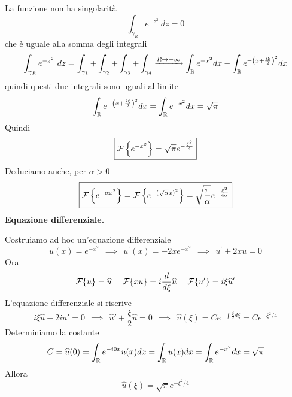 La funzione non ha singolarità
\begin{equation*}
\int_{\gamma_{R}} e^{- z^{2}} \ dz = 0
\end{equation*}
che è uguale alla somma degli integrali
\begin{equation*}
\int_{\gamma_{R}} e^{- z^{2}} \ dz = \int_{\gamma_{1}} + \int_{\gamma_{2}} + \int_{\gamma_{3}} + \int_{\gamma_{4}}\xrightarrow{R\rightarrow + \infty}\int_{\mathbb{R}} e^{- x^{2}} dx - \int_{\mathbb{R}} e^{- \left(x + \frac{i\xi}{2}\right)^{2}} dx
\end{equation*}
quindi questi due integrali sono uguali al limite
\begin{equation*}
\int_{\mathbb{R}} e^{- \left(x + \frac{i\xi}{2}\right)^{2}} dx = \int_{\mathbb{R}} e^{- x^{2}} dx = \sqrt{\pi}
\end{equation*}
Quindi
\begin{equation*}
\boxed{\mathcal{F} \left\{e^{- x^{2}}\right\} = \sqrt{\pi} e^{- \frac{\xi^{2}}{4}}}
\end{equation*}
Deduciamo anche, per $\alpha > 0$
\begin{equation*}
\boxed{\mathcal{F} \left\{e^{- \alpha x^{2}}\right\} = \mathcal{F} \left\{e^{- (\sqrt{\alpha} x)^{2}}\right\} = \sqrt{\frac{\pi}{\alpha}} e^{- \frac{\xi^{2}}{4\alpha}}}
\end{equation*}
\textbf{Equazione differenziale.}

Costruiamo ad hoc un'equazione differenziale
\begin{equation*}
u(x) = e^{- x^{2}} \ \ \implies \ \ u^{'} (x) = -2xe^{- x^{2}} \ \ \implies \ \ u^{'} + 2xu = 0
\end{equation*}
Ora
\begin{equation*}
\mathcal{F} \{u\} = \widehat{u} \ \ \ \ \mathcal{F} \{xu\} = i\frac{d}{d\xi}\widehat{u} \ \ \ \ \mathcal{F} \{u'\} = i\xi \widehat{u} '
\end{equation*}
L'equazione differenziale si riscrive
\begin{equation*}
i\xi \hat{u} + 2i\hat{u} ' = 0\ \ \implies \ \ \hat{u} ' + \frac{\xi}{2}\hat{u} = 0\ \ \implies \ \ \hat{u}(\xi) = Ce^{- \int \frac{\xi}{2} d\xi} = Ce^{- \xi^{2} /4}
\end{equation*}
Determiniamo la costante
\begin{equation*}
C = \widehat{u}(0) = \int_{\mathbb{R}} e^{- i0x} u(x) dx = \int_{\mathbb{R}} u(x) dx = \int_{\mathbb{R}} e^{- x^{2}} dx = \sqrt{\pi}
\end{equation*}
Allora
\begin{equation*}
\boxed{\hat{u}(\xi) = \sqrt{\pi} e^{- \xi^{2} /4}}
\end{equation*}
\Soluzione

